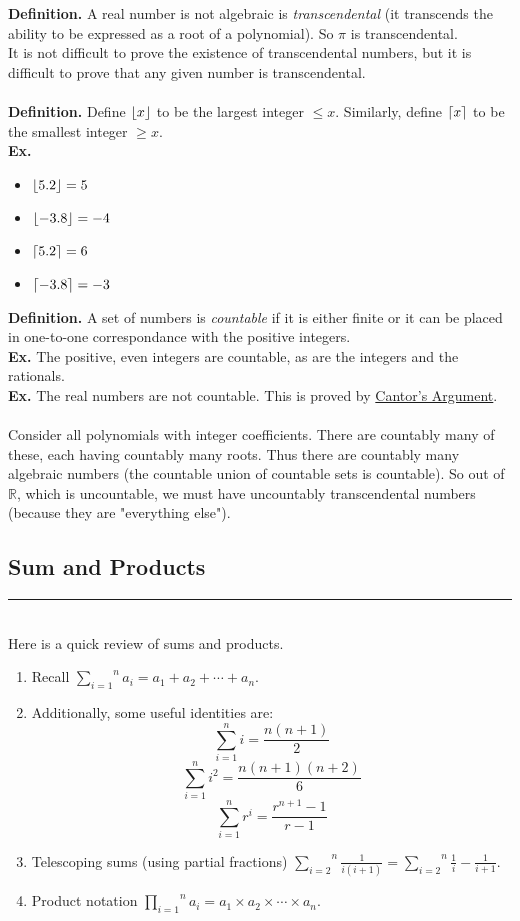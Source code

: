 \documentclass[class=article, crop=false]{standalone}
\def\inlinesum#1#2{\overset{#2}{\underset{#1}{\sum}}}
\def\inlineprod#1#2{\overset{#2}{\underset{#1}{\prod}}}
\DeclarePairedDelimiter\ceil{\lceil}{\rceil}
\DeclarePairedDelimiter\floor{\lfloor}{\rfloor}
\begin{document}
\textbf{Definition.} A real number is not algebraic is \emph{transcendental} (it transcends the ability to be expressed as a root of a polynomial).
So $\pi$ is transcendental.\\
It is not difficult to prove the existence of transcendental numbers, but it is difficult to prove that any given number is transcendental.\\\\
\textbf{Definition.} Define $\floor{x}$ to be the largest integer $\leq x$. Similarly, define $\ceil{x}$ to be the smallest integer $\geq x$.\\
\textbf{Ex.}
	\begin{itemize}
		\item $\floor{5.2} = 5$
		\item $\floor{-3.8} = -4$
		\item $\ceil{5.2} = 6$
		\item $\ceil{-3.8} = -3$
	\end{itemize}
\textbf{Definition.} A set of numbers is \emph{countable} if it is either finite or it can be placed in one-to-one correspondance
with the positive integers.\\
\textbf{Ex.} The positive, even integers are countable, as are the integers and the rationals.\\
\textbf{Ex.} The real numbers are not countable. This is proved by \href{https://jlmartin.ku.edu/~jlmartin/courses/math410-S13/cantor.pdf}{Cantor's Argument}.\\\\
Consider all polynomials with integer coefficients. There are countably many of these, each having countably many roots.
Thus there are countably many algebraic numbers (the countable union of countable sets is countable). So out of $\mathbb{R}$,
which is uncountable, we must have uncountably transcendental numbers (because they are "everything else").

\subsection{Sum and Products}
\rule{\textwidth}{1pt}\\
Here is a quick review of sums and products.
\begin{enumerate}[1.]
	\item Recall $\inlinesum{i=1}{n}a_i = a_1 + a_2 + \cdots + a_n$.
	\item Additionally, some useful identities are: $$\sum_{i=1}^{n} i = \frac{n(n+1)}{2}$$ 
	$$\sum_{i=1}^{n} i^2 = \frac{n(n+1)(n+2)}{6}$$
	$$\sum_{i=1}^{n} r^i = \frac{r^{n+1}-1}{r-1}$$
	\item Telescoping sums (using partial fractions) $\inlinesum{i=2}{n}\frac{1}{i(i+1)} = \inlinesum{i=2}{n}\frac{1}{i}-\frac{1}{i+1}$.
	\item Product notation $\inlineprod{i=1}{n} a_i = a_1 \times a_2 \times\cdots\times a_n$.
\end{enumerate}
\end{document}
